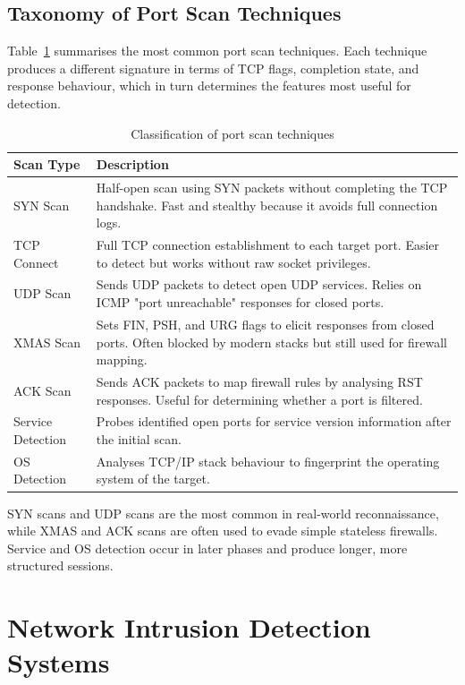 \documentclass[12pt,a4paper]{report}
\begin{document}
\subsection{Taxonomy of Port Scan Techniques}

Table~\ref{tab:scan_taxonomy} summarises the most common port scan techniques. Each technique produces a different signature in terms of TCP flags, completion state, and response behaviour, which in turn determines the features most useful for detection.

\begin{table}[H]
\centering
\caption{Classification of port scan techniques}
\label{tab:scan_taxonomy}
\begin{tabularx}{\textwidth}{lX}
\toprule
\textbf{Scan Type} & \textbf{Description} \\
\midrule
SYN Scan & Half-open scan using SYN packets without completing the TCP handshake. Fast and stealthy because it avoids full connection logs. \\
TCP Connect & Full TCP connection establishment to each target port. Easier to detect but works without raw socket privileges. \\
UDP Scan & Sends UDP packets to detect open UDP services. Relies on ICMP "port unreachable" responses for closed ports. \\
XMAS Scan & Sets FIN, PSH, and URG flags to elicit responses from closed ports. Often blocked by modern stacks but still used for firewall mapping. \\
ACK Scan & Sends ACK packets to map firewall rules by analysing RST responses. Useful for determining whether a port is filtered. \\
Service Detection & Probes identified open ports for service version information after the initial scan. \\
OS Detection & Analyses TCP/IP stack behaviour to fingerprint the operating system of the target. \\
\bottomrule
\end{tabularx}
\end{table}

SYN scans and UDP scans are the most common in real-world reconnaissance, while XMAS and ACK scans are often used to evade simple stateless firewalls. Service and OS detection occur in later phases and produce longer, more structured sessions.

\section{Network Intrusion Detection Systems}\label{sec:ids}
\end{document}
